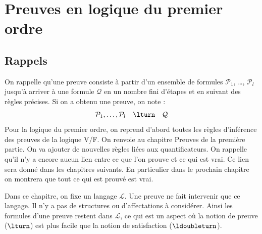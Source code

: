 \documentclass[11pt,class=report,crop=false]{standalone}
\begin{document}








\section{Preuves en logique du premier ordre}


\subsection{Rappels}

On rappelle qu'une preuve consiste à partir d'un ensemble de formules $\mathcal{P}_1$, \ldots, $\mathcal{P}_l$ jusqu'à arriver à une formule $\mathcal{Q}$ en un nombre fini d'étapes et en suivant des règles précises. Si on a obtenu une preuve, on note :
\[
\mathcal{P}_1, \ldots, \mathcal{P}_l \quad \lturn \quad \mathcal{Q}
\]
Pour la logique du premier ordre, on reprend d'abord toutes les règles d'inférence des preuves de la logique V/F.
On renvoie au chapitre \og{}Preuves\fg{} de la première partie.
On va ajouter de nouvelles règles liées aux quantificateurs.
On rappelle qu'il n'y a encore aucun lien entre ce que l'on prouve et ce qui est vrai. 
Ce lien sera donné dans les chapitres suivants. En particulier dans le prochain chapitre on montrera que tout ce qui est prouvé est vrai.


Dans ce chapitre, on fixe un langage $\mathcal{L}$. Une preuve ne fait intervenir que ce langage. 
Il n'y a pas de structures ou d'affectations à considérer.
Ainsi les formules d'une preuve restent dans $\mathcal{L}$, ce qui est un aspect où la notion de preuve ($\lturn$)
est plus facile que la notion de satisfaction ($\ldoubleturn$).
 
\end{document}
